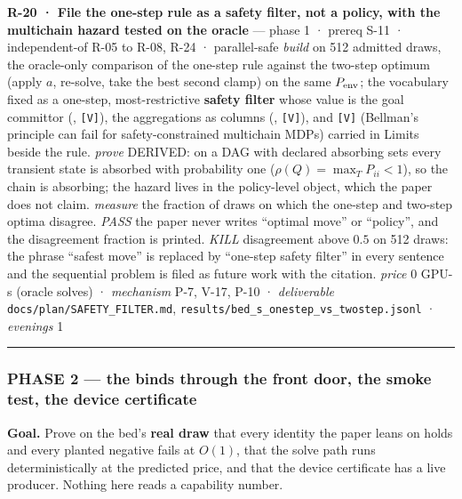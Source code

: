 \documentclass[11pt,a4paper]{article}
\theoremstyle{plain}
\theoremstyle{definition}
\theoremstyle{remark}
\begin{document}
\textbf{R-20 · File the one-step rule as a safety filter, not a policy,
with the multichain hazard tested on the oracle} --- phase 1 · prereq
S-11 · independent-of R-05 to R-08, R-24 · parallel-safe \emph{build} on
512 admitted draws, the oracle-only comparison of the one-step rule
against the two-step optimum (apply \(a\), re-solve, take the best
second clamp) on the same \(P_{\rm env}\); the vocabulary fixed as a
one-step, most-restrictive \textbf{safety filter} whose value is the
goal committor (\citep{hsu-2023-safetyfilter}, \citep{borquez-2023-lrf}
\texttt{{[}V{]}}), the aggregations as columns
(\citep{vanmoffaert-2013-chebyshev}, \citep{yang-2026-lexisafe}
\texttt{{[}V{]}}), and \citep{misra-2023-safety-constrained-mdp}
\texttt{{[}V{]}} (Bellman's principle can fail for safety-constrained
multichain MDPs) carried in Limits beside the rule. \emph{prove}
DERIVED: on a DAG with declared absorbing sets every transient state is
absorbed with probability one (\(\rho(Q)=\max_T P_{ii}<1\)), so the
chain is absorbing; the hazard lives in the policy-level object, which
the paper does not claim. \emph{measure} the fraction of draws on which
the one-step and two-step optima disagree. \emph{PASS} the paper never
writes ``optimal move'' or ``policy'', and the disagreement fraction is
printed. \emph{KILL} disagreement above \(0.5\) on 512 draws: the phrase
``safest move'' is replaced by ``one-step safety filter'' in every
sentence and the sequential problem is filed as future work with the
citation. \emph{price} \(0\) GPU-s (oracle solves) · \emph{mechanism}
P-7, V-17, P-10 · \emph{deliverable}
\texttt{docs/plan/SAFETY\_FILTER.md},
\texttt{results/bed\_s\_onestep\_vs\_twostep.jsonl} · \emph{evenings} 1

\begin{center}\rule{0.5\linewidth}{0.5pt}\end{center}

\subsubsection{PHASE 2 --- the binds through the front door, the smoke
test, the device
certificate}\label{phase-2-the-binds-through-the-front-door-the-smoke-test-the-device-certificate}

\textbf{Goal.} Prove on the bed's \textbf{real draw} that every identity
the paper leans on holds and every planted negative fails at \(O(1)\),
that the solve path runs deterministically at the predicted price, and
that the device certificate has a live producer. Nothing here reads a
capability number.
\end{document}
